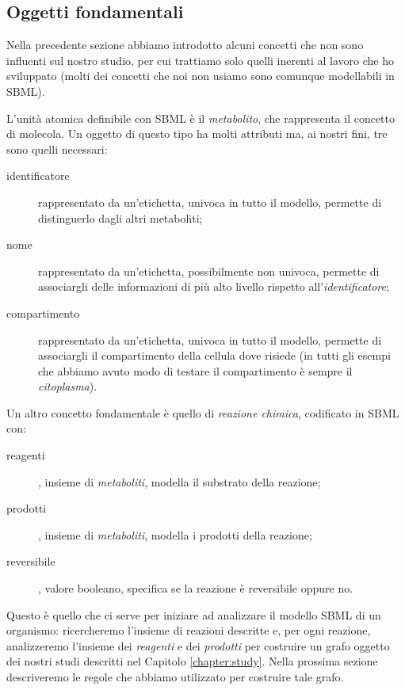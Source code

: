 \subsection{Oggetti fondamentali}
\label{sec:necessaryRealObjectsModeledInSBML}

Nella precedente sezione abbiamo introdotto alcuni concetti che non
sono influenti sul nostro studio, per cui trattiamo solo quelli
inerenti al lavoro che ho sviluppato (molti dei concetti che noi non
usiamo sono comunque modellabili in SBML).

L'unit\`a atomica definibile con SBML \`e il \emph{metabolito}, che
rappresenta il concetto di molecola.  Un oggetto di questo tipo ha
molti attributi ma, ai nostri fini, tre sono quelli necessari:
\begin{description}
\item[identificatore] rappresentato da un'etichetta, univoca in tutto
  il modello, permette di distinguerlo dagli altri metaboliti;
\item[nome] rappresentato da un'etichetta, possibilmente non univoca,
  permette di associargli delle informazioni di pi\`u alto livello
  rispetto all'\emph{identificatore};
\item[compartimento] rappresentato da un'etichetta, univoca in tutto
  il modello, permette di associargli il compartimento della cellula
  dove risiede (in tutti gli esempi che abbiamo avuto modo di testare
  il compartimento \`e sempre il \emph{citoplasma}).
\end{description}

Un altro concetto fondamentale \`e quello di \emph{reazione chimica},
codificato in SBML con:
\begin{description}
\item[reagenti], insieme di \emph{metaboliti}, modella il
  substrato della reazione;
\item[prodotti], insieme di \emph{metaboliti}, modella i
  prodotti della reazione;
\item[reversibile], valore booleano, specifica se la reazione \`e
  reversibile oppure no.
\end{description}

Questo \`e quello che ci serve per iniziare ad analizzare il modello
SBML di un organismo: ricercheremo l'insieme di reazioni descritte e,
per ogni reazione, analizzeremo l'insieme dei \emph{reagenti} e dei
\emph{prodotti} per costruire un grafo oggetto dei nostri studi
descritti nel Capitolo \ref{chapter:study}. Nella prossima sezione
descriveremo le regole che abbiamo utilizzato per costruire tale
grafo.

